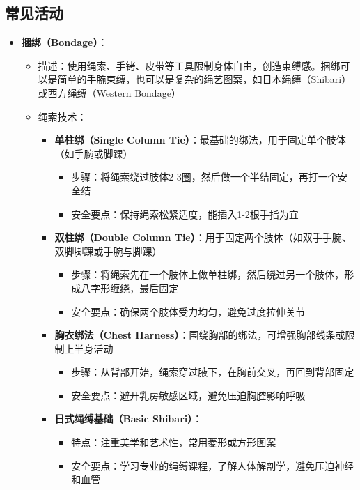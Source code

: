 \documentclass[12pt,UTF8]{ctexbook}
\begin{document}
\subsection{常见活动}
  \begin{itemize}
  \item \textbf{捆绑（Bondage）}：
    \begin{itemize}
    \item 描述：使用绳索、手铐、皮带等工具限制身体自由，创造束缚感。捆绑可以是简单的手腕束缚，也可以是复杂的绳艺图案，如日本绳缚（Shibari）或西方绳缚（Western Bondage）
    \item 绳索技术：
      \begin{itemize}
      \item \textbf{单柱绑（Single Column Tie）}：最基础的绑法，用于固定单个肢体（如手腕或脚踝）
        \begin{itemize}
        \item 步骤：将绳索绕过肢体2-3圈，然后做一个半结固定，再打一个安全结
        \item 安全要点：保持绳索松紧适度，能插入1-2根手指为宜
        \end{itemize}
      \item \textbf{双柱绑（Double Column Tie）}：用于固定两个肢体（如双手手腕、双脚脚踝或手腕与脚踝）
        \begin{itemize}
        \item 步骤：将绳索先在一个肢体上做单柱绑，然后绕过另一个肢体，形成八字形缠绕，最后固定
        \item 安全要点：确保两个肢体受力均匀，避免过度拉伸关节
        \end{itemize}
      \item \textbf{胸衣绑法（Chest Harness）}：围绕胸部的绑法，可增强胸部线条或限制上半身活动
        \begin{itemize}
        \item 步骤：从背部开始，绳索穿过腋下，在胸前交叉，再回到背部固定
        \item 安全要点：避开乳房敏感区域，避免压迫胸腔影响呼吸
        \end{itemize}
      \item \textbf{日式绳缚基础（Basic Shibari）}：
        \begin{itemize}
        \item 特点：注重美学和艺术性，常用菱形或方形图案
        \item 安全要点：学习专业的绳缚课程，了解人体解剖学，避免压迫神经和血管
        \end{itemize}

\end{itemize}
\end{itemize}
\end{itemize}
\end{document}
